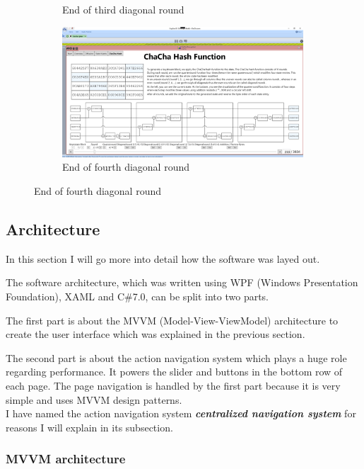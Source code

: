 \begin{figure}
\begin{subfigure}{0.5\textwidth}
  \caption{End of third diagonal round}
  \label{fig:chachahash.dr.3}
\end{subfigure}%
\begin{subfigure}{0.5\textwidth}
  \centering
  \includegraphics[width=0.99\textwidth]{figures/ct2/chachahash/chachahash-dr4-end.png}
  \caption{End of fourth diagonal round}
  \label{fig:chachahash.dr.4}
\end{subfigure}
\end{figure}

\subsection{Architecture}
\label{sec:Architecture}

In this section I will go more into detail how the software was layed out.

The software architecture, which was written using WPF (Windows Presentation Foundation), XAML and C\#7.0, can be split into two parts.

The first part is about the MVVM (Model-View-ViewModel) architecture to create the user interface which was explained in the previous section.

The second part is about the action navigation system which plays a huge role regarding performance. It powers the slider and buttons in the bottom row of each page. The page navigation is handled by the first part because it is very simple and uses MVVM design patterns. \\
I have named the action navigation system \textit{\textbf{centralized navigation system}} for reasons I will explain in its subsection.

\subsubsection{MVVM architecture}


